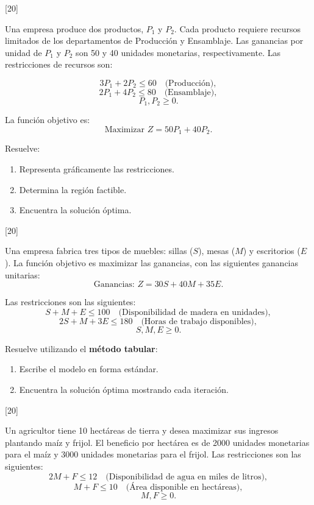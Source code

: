 \documentclass[11pt,paper=a4,answers, addpoints]{exam}
\begin{document}
\begin{questions}
[20]

Una empresa produce dos productos, \(P_1\) y \(P_2\). Cada producto requiere recursos limitados de los departamentos de Producción y Ensamblaje. Las ganancias por unidad de \(P_1\) y \(P_2\) son 50 y 40 unidades monetarias, respectivamente. Las restricciones de recursos son:

\[
3P_1 + 2P_2 \leq 60 \quad \text{(Producción)},
\]
\[
2P_1 + 4P_2 \leq 80 \quad \text{(Ensamblaje)},
\]
\[
P_1, P_2 \geq 0.
\]

La función objetivo es:
\[
\text{Maximizar } Z = 50P_1 + 40P_2.
\]

Resuelve:
\begin{enumerate}
    \item Representa gráficamente las restricciones.
    \item Determina la región factible.
    \item Encuentra la solución óptima.
\end{enumerate}

[20]

Una empresa fabrica tres tipos de muebles: sillas (\(S\)), mesas (\(M\)) y escritorios (\(E\)). La función objetivo es maximizar las ganancias, con las siguientes ganancias unitarias:
\[
\text{Ganancias: } Z = 30S + 40M + 35E.
\]

Las restricciones son las siguientes:
\[
S + M + E \leq 100 \quad \text{(Disponibilidad de madera en unidades)},
\]
\[
2S + M + 3E \leq 180 \quad \text{(Horas de trabajo disponibles)},
\]
\[
S, M, E \geq 0.
\]

Resuelve utilizando el {\bf método tabular}:
\begin{enumerate}
    \item Escribe el modelo en forma estándar.
    \item Encuentra la solución óptima mostrando cada iteración.
\end{enumerate}

[20]

Un agricultor tiene 10 hectáreas de tierra y desea maximizar sus ingresos plantando maíz y frijol. El beneficio por hectárea es de 2000 unidades monetarias para el maíz y 3000 unidades monetarias para el frijol. Las restricciones son las siguientes:
\[
2M + F \leq 12 \quad \text{(Disponibilidad de agua en miles de litros)},
\]
\[
M + F \leq 10 \quad \text{(Área disponible en hectáreas)},
\]
\[
M, F \geq 0.
\]


\end{questions}
\end{document}
